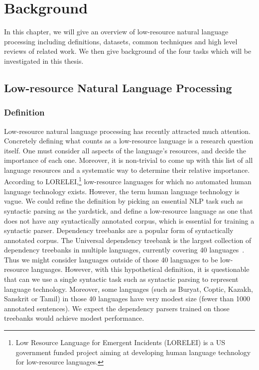 \documentclass[12pt,twoside,final,hidelinks]{ltthesis}
\theoremstyle{definition}
\begin{document}
\chapter{Background}
\label{chap:background}
In this chapter, we will give an overview of low-resource natural language processing including definitions, datasets, common techniques and  high level reviews of related work. We then give background of the four tasks which will be investigated in this thesis. 

\section{Low-resource Natural Language Processing}
\subsection{Definition}
Low-resource natural language processing has recently attracted much attention. Concretely defining what counts as a low-resource language is a research question itself.
One must consider all aspects of the language's resources, and decide the importance of each one. Moreover, it is non-trivial to come 
up with this list of all language resources and a systematic way to determine their relative importance. According to LORELEI,\footnote{Low Resource Language for Emergent Incidents (LORELEI) is a US government funded project aiming at developing 
human language technology for low-resource languages.} low-resource 
languages for which no automated human language technology exists. 
However, the term human language technology is vague. We could refine the definition by picking an essential NLP task such as syntactic parsing as the yardstick, and define a low-resource language as one that does not have any syntactically annotated corpus, which is essential 
for training a syntactic parser. Dependency treebanks are a popular form of syntactically annotated corpus. 
The Universal dependency treebank is the largest collection of dependency treebanks in multiple languages, currently 
covering 40 languages~\cite{11234/1-1699}. Thus we might consider languages outside of those 40 languages to be low-resource languages. However, with this hypothetical definition, it is questionable that can we use a single syntactic task such as 
syntactic parsing to represent language technology. Moreover, some languages (such as Buryat, Coptic, Kazakh, Sanskrit or Tamil) in those 40 languages have very modest size (fewer than 1000 annotated sentences). We expect the dependency parsers trained on those treebanks would  achieve modest performance. 
\end{document}
